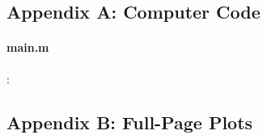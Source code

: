 \documentclass[12pt, letterpaper]{article}  %
\theoremstyle{definition}
\theoremstyle{remark}
\theoremstyle{plain}
\begin{document}







\newpage
\appendix
\appendixpage
\addappheadtotoc \setcounter{page}{1} 
\subsection*{Appendix A: Computer Code}
\singlespacing
\paragraph{main.m}:

\subsection*{Appendix B: Full-Page Plots}
\end{document}
